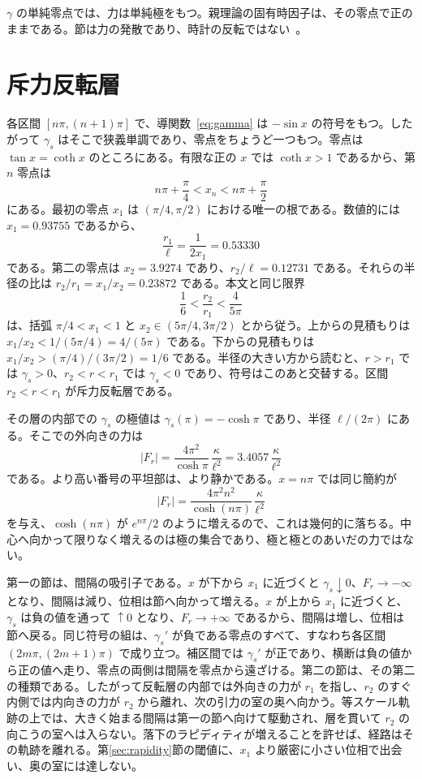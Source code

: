 \documentclass[a4paper]{article}
\begin{document}
\(\gamma\) の単純零点では、力は単純極をもつ。親理論の固有時因子は、その零点で正のままである。節は力の発散であり、時計の反転ではない~\cite{dst-main}。

\section{斥力反転層}
\label{sec:layer}

各区間 \([n\pi,(n+1)\pi]\) で、導関数~\eqref{eq:gamma} は \(-\sin x\) の符号をもつ。したがって \(\gamma_s\) はそこで狭義単調であり、零点をちょうど一つもつ。零点は \(\tan x=\coth x\) のところにある。有限な正の \(x\) では \(\coth x>1\) であるから、第 \(n\) 零点は
\[
n\pi+\frac{\pi}{4}<x_n<n\pi+\frac{\pi}{2}
\]
にある。最初の零点 \(x_1\) は \((\pi/4,\pi/2)\) における唯一の根である。数値的には \(x_1=0.93755\) であるから、
\[
\frac{r_1}{\ell}=\frac{1}{2x_1}=0.53330
\]
である。第二の零点は \(x_2=3.9274\) であり、\(r_2/\ell=0.12731\) である。それらの半径の比は \(r_2/r_1=x_1/x_2=0.23872\) である。本文と同じ限界
\[
\frac16<\frac{r_2}{r_1}<\frac{4}{5\pi}
\]
は、括弧 \(\pi/4<x_1<1\) と \(x_2\in(5\pi/4,3\pi/2)\) とから従う。上からの見積もりは \(x_1/x_2<1/(5\pi/4)=4/(5\pi)\) である。下からの見積もりは \(x_1/x_2>(\pi/4)/(3\pi/2)=1/6\) である。半径の大きい方から読むと、\(r>r_1\) では \(\gamma_s>0\)、\(r_2<r<r_1\) では \(\gamma_s<0\) であり、符号はこのあと交替する。区間 \(r_2<r<r_1\) が斥力反転層である。

その層の内部での \(\gamma_s\) の極値は \(\gamma_s(\pi)=-\cosh\pi\) であり、半径 \(\ell/(2\pi)\) にある。そこでの外向きの力は
\begin{equation}
\label{eq:plateau}
|F_r|
  =\frac{4\pi^{2}}{\cosh\pi}\,\frac{\kappa}{\ell^{2}}
  =3.4057\,\frac{\kappa}{\ell^{2}}
\end{equation}
である。より高い番号の平坦部は、より静かである。\(x=n\pi\) では同じ簡約が
\[
|F_r|=\frac{4\pi^{2} n^{2}}{\cosh(n\pi)}\,\frac{\kappa}{\ell^{2}}
\]
を与え、\(\cosh(n\pi)\) が \(e^{n\pi}/2\) のように増えるので、これは幾何的に落ちる。中心へ向かって限りなく増えるのは極の集合であり、極と極とのあいだの力ではない。

第一の節は、間隔の吸引子である。\(x\) が下から \(x_1\) に近づくと \(\gamma_s\downarrow 0\)、\(F_r\to-\infty\) となり、間隔は減り、位相は節へ向かって増える。\(x\) が上から \(x_1\) に近づくと、\(\gamma_s\) は負の値を通って \(\uparrow 0\) となり、\(F_r\to+\infty\) であるから、間隔は増し、位相は節へ戻る。同じ符号の組は、\(\gamma_s'\) が負である零点のすべて、すなわち各区間 \((2m\pi,(2m+1)\pi)\) で成り立つ。補区間では \(\gamma_s'\) が正であり、横断は負の値から正の値へ走り、零点の両側は間隔を零点から遠ざける。第二の節は、その第二の種類である。したがって反転層の内部では外向きの力が \(r_1\) を指し、\(r_2\) のすぐ内側では内向きの力が \(r_2\) から離れ、次の引力の室の奥へ向かう。等スケール軌跡の上では、大きく始まる間隔は第一の節へ向けて駆動され、層を貫いて \(r_2\) の向こうの室へは入らない。落下のラピディティが増えることを許せば、経路はその軌跡を離れる。第\ref{sec:rapidity}節の閾値に、\(x_1\) より厳密に小さい位相で出会い、奥の室には達しない。
\end{document}
